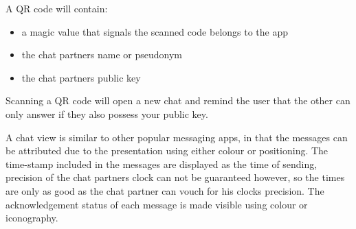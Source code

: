 A QR code will contain:\begin{itemize}
	\item {a magic value that signals the scanned code belongs to the app}
	\item {the chat partners name or pseudonym}
	\item {the chat partners public key}
\end{itemize}
Scanning a QR code will open a new chat and remind the user that the other can only answer if they also possess your public key.

A chat view is similar to other popular messaging apps, in that the messages can be attributed due to the presentation using either colour or positioning. The time-stamp included in the messages are displayed as the time of sending, precision of the chat partners clock can not be guaranteed however, so the times are only as good as the chat partner can vouch for his clocks precision. The acknowledgement status of each message is made visible using colour or iconography.
